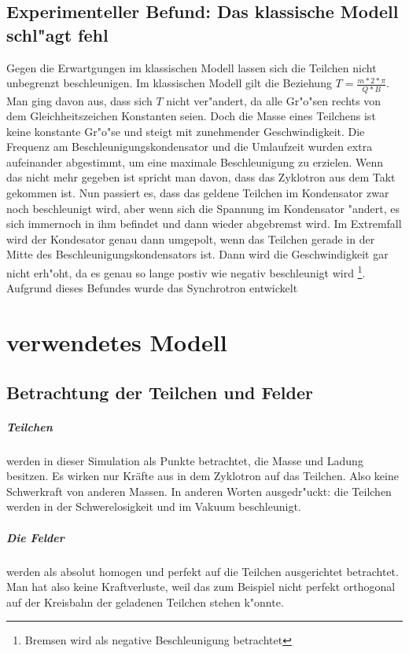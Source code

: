 \documentclass[14pt, a4paper]{report}
\begin{document}
\section{Experimenteller Befund: Das klassische Modell schl"agt fehl}
Gegen die Erwartgungen im klassischen Modell 
lassen sich die Teilchen nicht unbegrenzt beschleunigen. Im klassischen Modell
gilt die Beziehung $T = \frac{m * 2 * \pi }{Q * B}$.
Man ging davon aus, dass sich $T$ nicht ver"andert, da alle Gr"o"sen rechts von dem 
Gleichheitszeichen Konstanten seien. Doch die Masse eines Teilchens
ist keine konstante Gr"o"se  und steigt mit zunehmender 
Geschwindigkeit. Die Frequenz am Beschleunigungskondensator und die Umlaufzeit wurden
extra aufeinander abgestimmt, um eine maximale Beschleunigung zu erzielen. Wenn das 
nicht mehr gegeben ist spricht man davon, dass das Zyklotron aus dem Takt gekommen ist.
\label{Zyklotron aus dem Takt}
Nun passiert es,
dass das geldene Teilchen im Kondensator zwar noch beschleunigt wird, aber wenn sich die
Spannung im Kondensator "andert, es sich immernoch in ihm befindet und dann wieder 
abgebremst wird. Im Extremfall wird der Kondesator genau dann umgepolt, wenn das 
Teilchen gerade in der Mitte des Beschleunigungskondensators ist. Dann wird die 
Geschwindigkeit gar nicht erh"oht, da es genau so lange postiv wie negativ beschleunigt 
wird \footnote{Bremsen wird als negative Beschleunigung betrachtet}.
Aufgrund dieses Befundes wurde das Synchrotron entwickelt 

\chapter{verwendetes Modell}
\section{Betrachtung der Teilchen und Felder}
\paragraph{Teilchen} 
werden in dieser Simulation als Punkte betrachtet, die Masse und Ladung
besitzen. Es wirken nur Kräfte aus in dem Zyklotron auf das Teilchen. Also keine
Schwerkraft von anderen Massen. In anderen Worten ausgedr"uckt: 
die Teilchen werden in der Schwerelosigkeit und im Vakuum beschleunigt.

\paragraph{Die Felder} 
werden als absolut homogen und perfekt auf die Teilchen ausgerichtet
betrachtet. Man hat also keine Kraftverluste, weil das zum Beispiel nicht perfekt
orthogonal auf der Kreisbahn der geladenen Teilchen stehen k"onnte.
\end{document}
